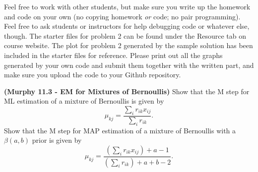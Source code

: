 \documentclass[12pt,letterpaper,fleqn]{hmcpset}
\begin{document}
Feel free to work with other students, but make sure you write up the homework
and code on your own (no copying homework \textit{or} code; no pair programming).
Feel free to ask students or instructors for help debugging code or whatever else,
though.
\newline
\newline
The starter files for problem 2 can be found under the Resource tab on course website. The plot for problem 2 generated by the sample solution has been included in the starter files for reference. Please print out all the graphs generated by your own code and submit them together with the written part, and make sure you upload the code to your Github repository.

\begin{problem}[1]
\textbf{(Murphy 11.3 - EM for Mixtures of Bernoullis)} Show that the M step for ML estimation
of a mixture of Bernoullis is given by
\[
    \mu_{kj} = \frac{\sum_i r_{ik}x_{ij}}{\sum_i r_{ik}}.
\]
Show that the M step for MAP estimation of a mixture of Bernoullis with a $\beta(a,b)$ prior
is given by
\[
    \mu_{kj} = \frac{\left(\sum_i r_{ik}x_{ij}\right) + a - 1}{\left(\sum_i r_{ik}\right) + a + b - 2}.
\]
\end{problem}
\end{document}
